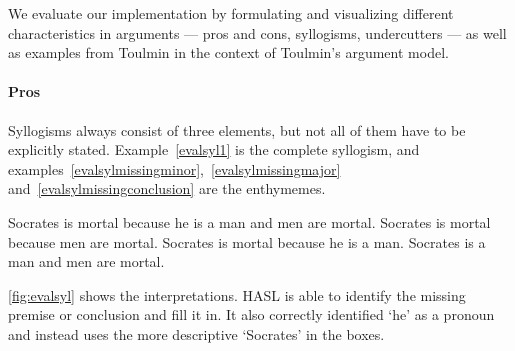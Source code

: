 We evaluate our implementation by formulating and visualizing different characteristics in arguments --- pros and cons, syllogisms, undercutters --- as well as examples from Toulmin in the context of Toulmin's argument model.

\paragraph{Pros}
Syllogisms always consist of three elements, but not all of them have to be explicitly stated. Example~\ref{evalsyl1} is the complete syllogism, and examples~\ref{evalsylmissingminor},~\ref{evalsylmissingmajor} and~\ref{evalsylmissingconclusion} are the enthymemes.

\begin{exe}
	\ex\label{evalsyl1} Socrates is mortal because he is a man and men are mortal.
	\ex\label{evalsylmissingminor} Socrates is mortal because men are mortal.
	\ex\label{evalsylmissingmajor} Socrates is mortal because he is a man.
	\ex\label{evalsylmissingconclusion} Socrates is a man and men are mortal.
\end{exe}

\noindent \autoref{fig:evalsyl} shows the interpretations. HASL is able to identify the missing premise or conclusion and fill it in. It also correctly identified `he' as a pronoun and instead uses the more descriptive `Socrates' in the boxes.

